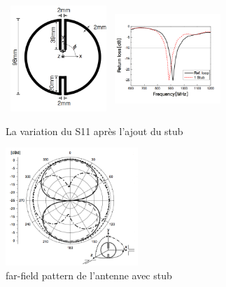 \documentclass[11pt, a4paper, twoside]{book}
\begin{document}
\begin{figure}[H]
\centering
\includegraphics[width=4cm, height=4cm]{stuba}
\includegraphics[width=4cm, height=4cm]{stubb}
\caption{La variation du S11 après l'ajout du stub}
\end{figure}

\begin{figure}[H]
\centering
\includegraphics[width=5cm]{lob}
\caption{far-field pattern de l'antenne avec stub}
\end{figure}
\end{document}
